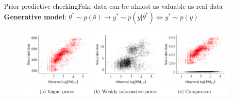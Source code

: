 \documentclass{beamer}
\begin{document}
	\begin{frame}{Prior predictive checking}{Fake data can be almost as valuable as real data}
		\textbf{Generative model}:	$ \theta^* \sim p(\theta) \longrightarrow y^* \sim p(y|\theta^*) \Longleftrightarrow  y^* \sim p(y)$
		
		\begin{figure}
			\includegraphics[scale=0.3]{images/fake_data.png}
		\end{figure}
			
		
		
	\end{frame}
\end{document}
